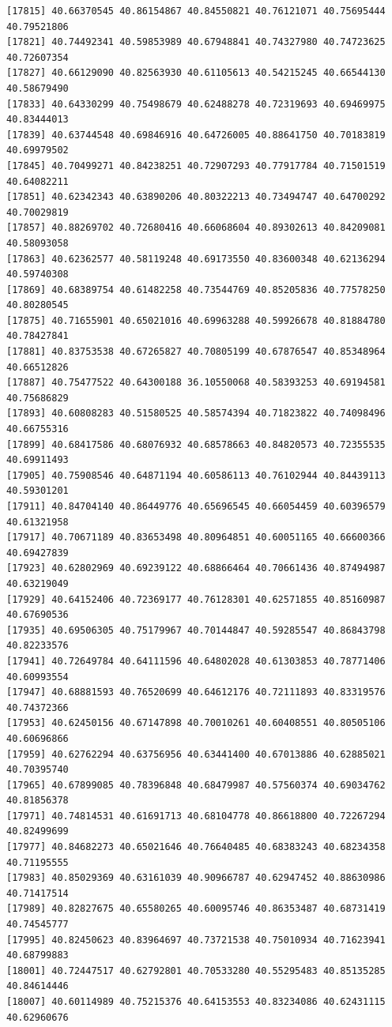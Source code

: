 \documentclass[
  letterpaper,
  DIV=11,
  numbers=noendperiod]{scrartcl}
\begin{document}
\begin{verbatim}
[17815] 40.66370545 40.86154867 40.84550821 40.76121071 40.75695444 40.79521806
[17821] 40.74492341 40.59853989 40.67948841 40.74327980 40.74723625 40.72607354
[17827] 40.66129090 40.82563930 40.61105613 40.54215245 40.66544130 40.58679490
[17833] 40.64330299 40.75498679 40.62488278 40.72319693 40.69469975 40.83444013
[17839] 40.63744548 40.69846916 40.64726005 40.88641750 40.70183819 40.69979502
[17845] 40.70499271 40.84238251 40.72907293 40.77917784 40.71501519 40.64082211
[17851] 40.62342343 40.63890206 40.80322213 40.73494747 40.64700292 40.70029819
[17857] 40.88269702 40.72680416 40.66068604 40.89302613 40.84209081 40.58093058
[17863] 40.62362577 40.58119248 40.69173550 40.83600348 40.62136294 40.59740308
[17869] 40.68389754 40.61482258 40.73544769 40.85205836 40.77578250 40.80280545
[17875] 40.71655901 40.65021016 40.69963288 40.59926678 40.81884780 40.78427841
[17881] 40.83753538 40.67265827 40.70805199 40.67876547 40.85348964 40.66512826
[17887] 40.75477522 40.64300188 36.10550068 40.58393253 40.69194581 40.75686829
[17893] 40.60808283 40.51580525 40.58574394 40.71823822 40.74098496 40.66755316
[17899] 40.68417586 40.68076932 40.68578663 40.84820573 40.72355535 40.69911493
[17905] 40.75908546 40.64871194 40.60586113 40.76102944 40.84439113 40.59301201
[17911] 40.84704140 40.86449776 40.65696545 40.66054459 40.60396579 40.61321958
[17917] 40.70671189 40.83653498 40.80964851 40.60051165 40.66600366 40.69427839
[17923] 40.62802969 40.69239122 40.68866464 40.70661436 40.87494987 40.63219049
[17929] 40.64152406 40.72369177 40.76128301 40.62571855 40.85160987 40.67690536
[17935] 40.69506305 40.75179967 40.70144847 40.59285547 40.86843798 40.82233576
[17941] 40.72649784 40.64111596 40.64802028 40.61303853 40.78771406 40.60993554
[17947] 40.68881593 40.76520699 40.64612176 40.72111893 40.83319576 40.74372366
[17953] 40.62450156 40.67147898 40.70010261 40.60408551 40.80505106 40.60696866
[17959] 40.62762294 40.63756956 40.63441400 40.67013886 40.62885021 40.70395740
[17965] 40.67899085 40.78396848 40.68479987 40.57560374 40.69034762 40.81856378
[17971] 40.74814531 40.61691713 40.68104778 40.86618800 40.72267294 40.82499699
[17977] 40.84682273 40.65021646 40.76640485 40.68383243 40.68234358 40.71195555
[17983] 40.85029369 40.63161039 40.90966787 40.62947452 40.88630986 40.71417514
[17989] 40.82827675 40.65580265 40.60095746 40.86353487 40.68731419 40.74545777
[17995] 40.82450623 40.83964697 40.73721538 40.75010934 40.71623941 40.68799883
[18001] 40.72447517 40.62792801 40.70533280 40.55295483 40.85135285 40.84614446
[18007] 40.60114989 40.75215376 40.64153553 40.83234086 40.62431115 40.62960676

\end{verbatim}
\end{document}
